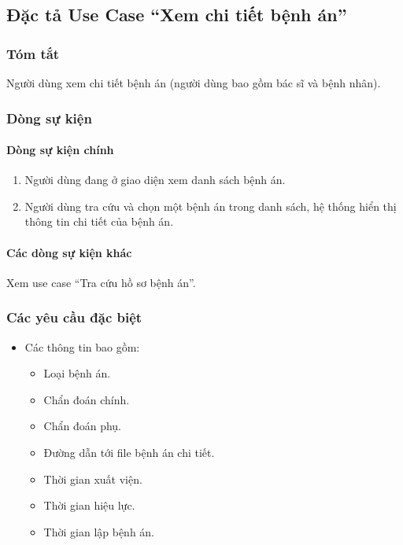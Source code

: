 \subsection{Đặc tả Use Case ``Xem chi tiết bệnh án''}

\subsubsection{Tóm tắt}
Người dùng xem chi tiết bệnh án (người dùng bao gồm bác sĩ và bệnh nhân).

\subsubsection{Dòng sự kiện}
\paragraph{\textbf{Dòng sự kiện chính}}
\begin{enumerate}
  \item Người dùng đang ở giao diện xem danh sách bệnh án.
  \item Người dùng tra cứu và chọn một bệnh án trong danh sách, hệ thống hiển thị thông tin chi tiết của bệnh án.
\end{enumerate}

\paragraph{\textbf{Các dòng sự kiện khác}}
Xem use case ``Tra cứu hồ sơ bệnh án''.

\subsubsection{Các yêu cầu đặc biệt}
\begin{itemize}
  \item Các thông tin bao gồm:
    \begin{itemize}
      \item Loại bệnh án.
      \item Chẩn đoán chính.
      \item Chẩn đoán phụ.
      \item Đường dẫn tới file bệnh án chi tiết.
      \item Thời gian xuất viện.
      \item Thời gian hiệu lực.
      \item Thời gian lập bệnh án.
    \end{itemize}
\end{itemize}

